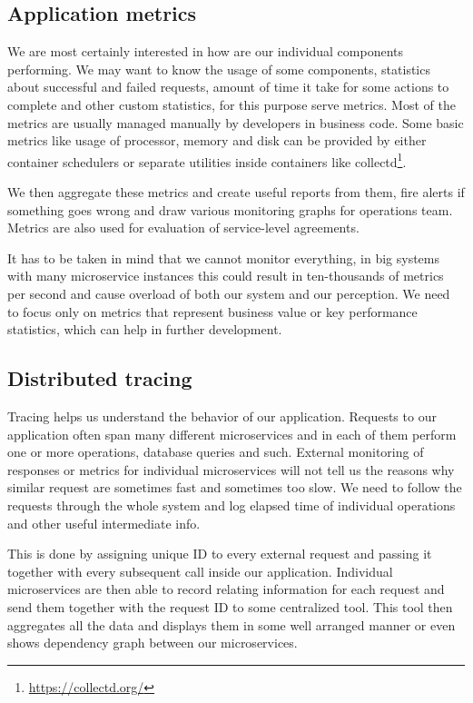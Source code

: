 \documentclass[12pt,oneside]{fithesis2}
\begin{document}
\subsection{Application metrics}
We are most certainly interested in how are our individual components performing. We may want to know the usage of some components, statistics about successful and failed requests, amount of time it take for some actions to complete and other custom statistics, for this purpose serve metrics. Most of the metrics are usually managed manually by developers in business code. Some basic metrics like usage of processor, memory and disk can be provided by either container schedulers or separate utilities inside containers like collectd\footnote{\url{https://collectd.org/}}.

We then aggregate these metrics and create useful reports from them, fire alerts if something goes wrong and draw various monitoring graphs for operations team. Metrics are also used for evaluation of service-level agreements.

It has to be taken in mind that we cannot monitor everything, in big systems with many microservice instances this could result in ten-thousands of metrics per second and cause overload of both our system and our perception. We need to focus only on metrics that represent business value or key performance statistics, which can help in further development.

\subsection{Distributed tracing}
Tracing helps us understand the behavior of our application. Requests to our application often span many different microservices and in each of them perform one or more operations, database queries and such. External monitoring of responses or metrics for individual microservices will not tell us the reasons why similar request are sometimes fast and sometimes too slow. We need to follow the requests through the whole system and log elapsed time of individual operations and other useful intermediate info.

This is done by assigning unique ID to every external request and passing it together with every subsequent call inside our application. Individual microservices are then able to record relating information for each request and send them together with the request ID to some centralized tool. This tool then aggregates all the data and displays them in some well arranged manner or even shows dependency graph between our microservices. 
\end{document}
